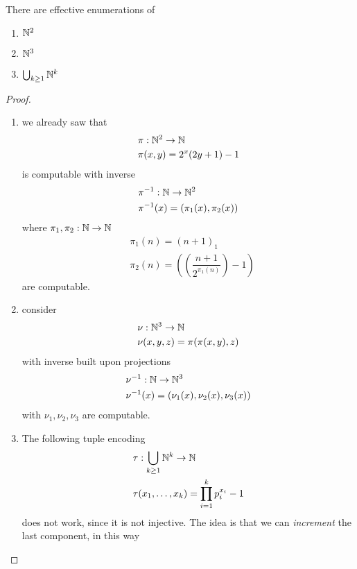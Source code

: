 \begin{lemma}
  There are effective enumerations of
  \begin{enumerate}[label=(\arabic*)]
  \item $\mathbb{N}^2$
  \item $\mathbb{N}^3$
  \item $\bigcup_{k\geq 1} \mathbb{N}^k $
  \end{enumerate}
  \begin{proof}
    \begin{enumerate}[label=(\arabic*)]
    \item we already saw that 
      \begin{align*}
        &\pi : \mathbb{N}^2 \to
        \mathbb{N} \\
        &\pi(x,y) = 2^x(2y+1)-1
      \end{align*}  
     is computable
       with inverse
       \begin{align*}
        &\pi^{-1} : \mathbb{N} \to \mathbb{N}^2\\
        &\pi^{-1}(x) = (\pi_1(x), \pi_2(x))
       \end{align*}
      where $\pi_1,\pi_2 : \mathbb{N} \to \mathbb{N}$
      \begin{align*}
        &\pi_1 (n) = (n+1)_1\\
        &\pi_2(n) = \left(\left(\dfrac{n+1}{2^{\pi_1(n)}}\right)-1\right)
       \end{align*}
       are computable.
    \item{
        consider 
        \begin{align*}
          &\nu : \mathbb{N}^3 \to
          \mathbb{N}\\
          &\nu(x,y,z)= \pi(\pi(x,y),z)
        \end{align*}
        with inverse built upon projections
        \begin{align*}
          &\nu^{-1} : \mathbb{N} \to \mathbb{N}^3\\
          &\nu^{-1}(x) = (\nu_1(x), \nu_2(x), \nu_3(x))
        \end{align*}
        with $\nu_1, \nu_2, \nu_3$ are computable.}
    \item{ The following tuple encoding
    \begin{align*}
      &\tau : \bigcup_{k \geq 1} \mathbb{N}^k \to \mathbb{N}\\
      &\tau(x_1, \dots, x_k) = \prod_{i=1}^{k}p_i^{x_i}-1
    \end{align*}
    does not work, since it is not injective.
    The idea is that we can \emph{increment} the last component, in this way
}
\end{enumerate}
\end{proof}
\end{lemma}
